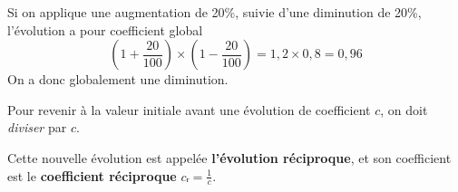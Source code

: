 \documentclass[classe=1STI2D]{coursclass}
\begin{document}
\begin{exemple}
	Si on applique une augmentation de 20\%, suivie d'une diminution de 20\%, l'évolution a pour coefficient global
	$$ \left(1 + \frac{20}{100}\right) × \left(1 - \frac{20}{100}\right) = 1,2 × 0,8 = 0,96 $$
	On a donc globalement une diminution.
\end{exemple}

\begin{propriete}
	Pour revenir à la valeur initiale avant une évolution de coefficient $c$, on doit \textit{diviser} par $c$.

	Cette nouvelle évolution est appelée \textbf{l'évolution réciproque}, et son coefficient est le \textbf{coefficient réciproque} $cᵣ = \frac{1}{c}$.
\end{propriete}
\end{document}
